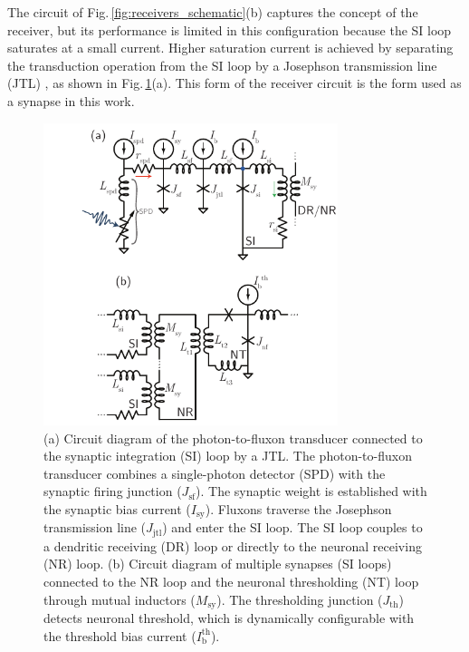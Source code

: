 \documentclass[aip,amsmath,amssymb,reprint,nofootinbib]{revtex4-1}
\begin{document}
The circuit of Fig.\,\ref{fig:receivers_schematic}(b) captures the concept of the receiver, but its performance is limited in this configuration because the SI loop saturates at a small current. Higher saturation current is achieved by separating the transduction operation from the SI loop by a Josephson transmission line (JTL) \cite{ka1999,vatu1998}, as shown in Fig.\,\ref{fig:receivers_circuitDiagrams}(a). This form of the receiver circuit is the form used as a synapse in this work. 
\begin{figure}[t!]
	\centerline{\includegraphics[width=8.6cm]{_receivers_circuitDiagrams_small.pdf}}
	\caption{\label{fig:receivers_circuitDiagrams}(a) Circuit diagram of the photon-to-fluxon transducer connected to the synaptic integration (SI) loop by a JTL. The photon-to-fluxon transducer combines a single-photon detector (SPD) with the synaptic firing junction ($J_{\mathrm{sf}}$). The synaptic weight is established with the synaptic bias current ($I_{\mathrm{sy}}$). Fluxons traverse the Josephson transmission line ($J_{\mathrm{jtl}}$) and enter the SI loop. The SI loop couples to a dendritic receiving (DR) loop or directly to the neuronal receiving (NR) loop. (b) Circuit diagram of multiple synapses (SI loops) connected to the NR loop and the neuronal thresholding (NT) loop through mutual inductors ($M_{\mathrm{sy}}$). The thresholding junction ($J_{\mathrm{th}}$) detects neuronal threshold, which is dynamically configurable with the threshold bias current ($I_{\mathrm{b}}^{\mathrm{th}}$).}
\end{figure}
\end{document}
